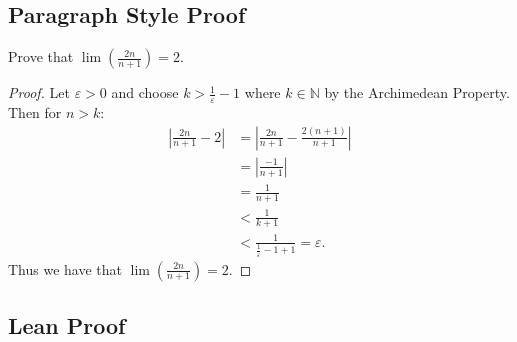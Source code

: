 \documentclass[
  letterpaper,
]{scrreprt}
\newcommand{\excl}[1]{}
\theoremstyle{remark}
\begin{document}
\hypertarget{paragraph-style-proof-3}{%
\subsection{Paragraph Style Proof}\label{paragraph-style-proof-3}}

\begin{thm}
Prove that \(\lim(\frac{2n}{n + 1}) = 2.\)

\end{thm}

\begin{proof}

Let \(\varepsilon > 0\) and choose \(k > \frac{1}{\varepsilon} - 1\)
where \(k \in \mathbb{N}\) by the Archimedean Property. Then for
\(n > k:\) \begin{align*}
\left|\frac{2n}{n + 1} - 2\right| & = \left|\frac{2n}{n + 1} - \frac{2(n + 1)}{n + 1}\right|\\
& = \left|\frac{-1}{n + 1}\right|\\
& = \frac{1}{n + 1}\\
& < \frac{1}{k + 1}\\
& < \frac{1}{\frac{1}{\varepsilon} - 1 + 1} = \varepsilon.
\end{align*} Thus we have that \(\lim(\frac{2n}{n + 1}) = 2.\)
\excl{~□}\qedhere

\end{proof}

\hypertarget{lean-proof-3}{%
\subsection{Lean Proof}\label{lean-proof-3}}
\end{document}
